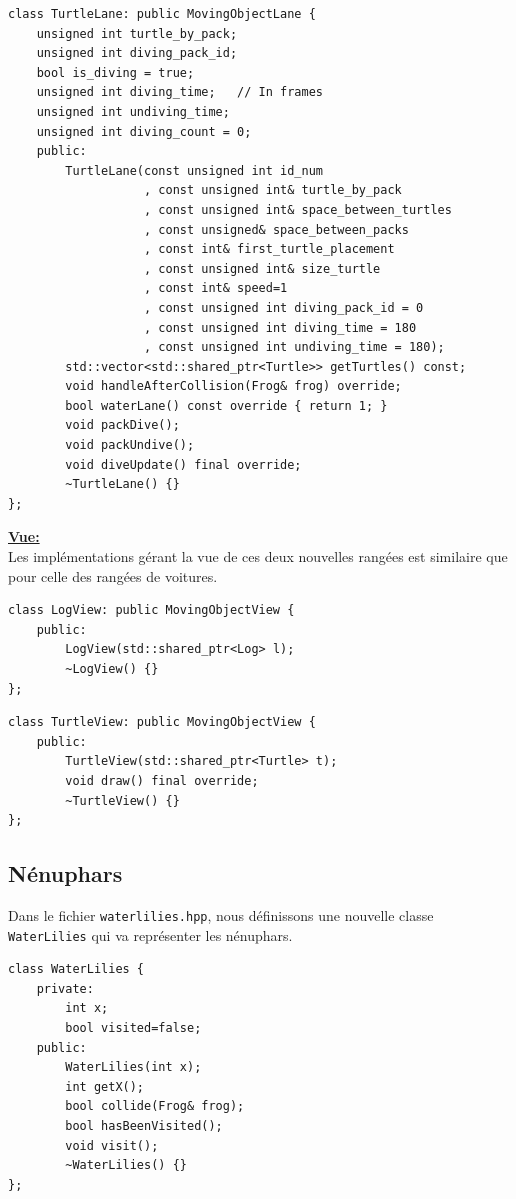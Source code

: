 \documentclass[a4paper, 12pt]{article}
\begin{document}
\begin{lstlisting}
class TurtleLane: public MovingObjectLane {
    unsigned int turtle_by_pack;
    unsigned int diving_pack_id;
    bool is_diving = true;
    unsigned int diving_time;   // In frames
    unsigned int undiving_time;
    unsigned int diving_count = 0;
    public:
        TurtleLane(const unsigned int id_num
                   , const unsigned int& turtle_by_pack
                   , const unsigned int& space_between_turtles
                   , const unsigned& space_between_packs
                   , const int& first_turtle_placement
                   , const unsigned int& size_turtle
                   , const int& speed=1
                   , const unsigned int diving_pack_id = 0
                   , const unsigned int diving_time = 180
                   , const unsigned int undiving_time = 180);
        std::vector<std::shared_ptr<Turtle>> getTurtles() const;
        void handleAfterCollision(Frog& frog) override;
        bool waterLane() const override { return 1; }
        void packDive();
        void packUndive();
        void diveUpdate() final override;
        ~TurtleLane() {}
};
\end{lstlisting}

\underline{\textbf{Vue:}} \\
Les implémentations gérant la vue de ces deux nouvelles rangées est similaire que pour celle 
des rangées de voitures.
\begin{lstlisting}
class LogView: public MovingObjectView {
    public:
        LogView(std::shared_ptr<Log> l);
        ~LogView() {}
};
\end{lstlisting}

\begin{lstlisting}
class TurtleView: public MovingObjectView {
    public:
        TurtleView(std::shared_ptr<Turtle> t);
        void draw() final override;
        ~TurtleView() {}
};
\end{lstlisting}

\subsection{Nénuphars} \label{lilies}

Dans le fichier \texttt{waterlilies.hpp}, 
nous définissons une nouvelle classe \texttt{WaterLilies} qui va représenter les nénuphars. 

\begin{lstlisting}
class WaterLilies {
    private:
        int x;
        bool visited=false;
    public:
        WaterLilies(int x);
        int getX();
        bool collide(Frog& frog);
        bool hasBeenVisited();
        void visit();
        ~WaterLilies() {}
};
\end{lstlisting}
\end{document}

